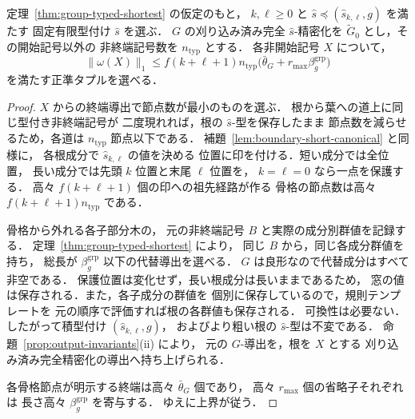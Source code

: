 \begin{lemma}[窓と任意有限群の型付けに対する短い正準タプル]
\label{lem:window-group-short}
定理~\ref{thm:group-typed-shortest} の仮定のもと，
$k,\ell\ge0$ と
$\widehat{s}\preceq(\widehat{s}_{k,\ell},g)$ を満たす
固定有限型付け $\widehat{s}$ を選ぶ．
$G$ の刈り込み済み完全 $\widehat{s}$-精密化を
$\widetilde G_0$ とし，その開始記号以外の
非終端記号数を $n_{\mathrm{typ}}$ とする．
各非開始記号 $X$ について，
\[
 \|\omega(X)\|_1\le
 f(k+\ell+1)n_{\mathrm{typ}}
 \bigl(\bar\theta_G+r_{\max}\beta_g^{\mathrm{grp}}\bigr)
\]
を満たす正準タプルを選べる．
\end{lemma}
\begin{proof}
$X$ からの終端導出で節点数が最小のものを選ぶ．
根から葉への道上に同じ型付き非終端記号が
二度現れれば，根の $\widehat{s}$-型を保存したまま
節点数を減らせるため，各道は
$n_{\mathrm{typ}}$ 節点以下である．
補題~\ref{lem:boundary-short-canonical} と同様に，
各根成分で $\widehat{s}_{k,\ell}$ の値を決める
位置に印を付ける．短い成分では全位置，
長い成分では先頭 $k$ 位置と末尾 $\ell$ 位置を，
$k=\ell=0$ なら一点を保護する．
高々 $f(k+\ell+1)$ 個の印への祖先経路が作る
骨格の節点数は高々
$f(k+\ell+1)n_{\mathrm{typ}}$ である．

骨格から外れる各子部分木の，
元の非終端記号 $B$ と実際の成分別群値を記録する．
定理~\ref{thm:group-typed-shortest} により，
同じ $B$ から，同じ各成分群値を持ち，
総長が $\beta_g^{\mathrm{grp}}$ 以下の代替導出を選べる．
$G$ は良形なので代替成分はすべて非空である．
保護位置は変化せず，長い根成分は長いままであるため，
窓の値は保存される．また，各子成分の群値を
個別に保存しているので，規則テンプレートを
元の順序で評価すれば根の各群値も保存される．
可換性は必要ない．
したがって積型付け $(\widehat{s}_{k,\ell},g)$，
およびより粗い根の $\widehat{s}$-型は不変である．
命題~\ref{prop:output-invariants}(ii) により，
元の $G$-導出を，根を $X$ とする
刈り込み済み完全精密化の導出へ持ち上げられる．

各骨格節点が明示する終端は高々
$\bar\theta_G$ 個であり，
高々 $r_{\max}$ 個の省略子それぞれは
長さ高々 $\beta_g^{\mathrm{grp}}$ を寄与する．
ゆえに上界が従う．
\end{proof}


